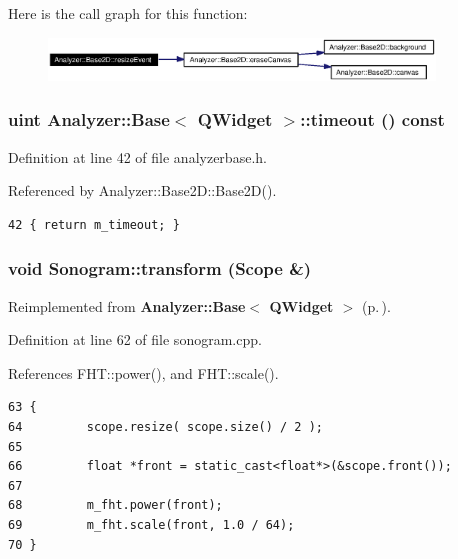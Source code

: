 Here is the call graph for this function:\begin{figure}[H]
\begin{center}
\leavevmode
\includegraphics[width=291pt]{classAnalyzer_1_1Base2D_Sonogramb3_cgraph}
\end{center}
\end{figure}
\subsubsection{\setlength{\rightskip}{0pt plus 5cm}uint {\bf Analyzer::Base}$<$ {\bf QWidget}  $>$::timeout () const\hspace{0.3cm}{\tt  [inline, inherited]}}\label{classAnalyzer_1_1Base_Analyzer_1_1Basea0}




Definition at line 42 of file analyzerbase.h.

Referenced by Analyzer::Base2D::Base2D().



\footnotesize\begin{verbatim}42 { return m_timeout; }
\end{verbatim}\normalsize 
{}
\subsubsection{\setlength{\rightskip}{0pt plus 5cm}void Sonogram::transform (Scope \&)\hspace{0.3cm}{\tt  [virtual]}}\label{classSonogram_Sonograma4}




Reimplemented from {\bf Analyzer::Base$<$ QWidget $>$} {\rm (p.\,\pageref{classAnalyzer_1_1Base_Analyzer_1_1Baseb2})}.

Definition at line 62 of file sonogram.cpp.

References FHT::power(), and FHT::scale().



\footnotesize\begin{verbatim}63 {
64         scope.resize( scope.size() / 2 );
65 
66         float *front = static_cast<float*>(&scope.front());
67 
68         m_fht.power(front);
69         m_fht.scale(front, 1.0 / 64);
70 }
\end{verbatim}\normalsize 


